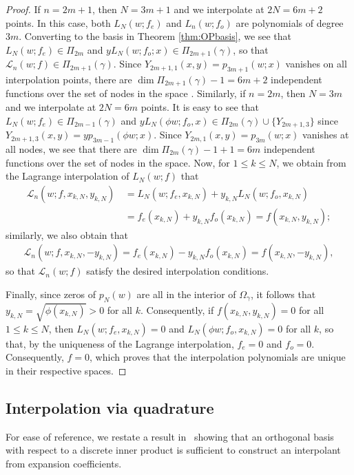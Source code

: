 \documentclass{amsart}
\theoremstyle{remark}
\def\g{{\gamma}}
\def\CL{{\mathcal L}}
\begin{document}
\begin{proof}
If $n = 2m+1$, then $N =3m+1$ and  we interpolate at $2N = 6m+2$ points. In this case, both 
$L_N(w;f_e)$ and $L_n(w;f_o)$ are polynomials of degree $3m$. Converting to the basis in 
Theorem \ref{thm:OPbasis}, we see that $L_N(w;f_e) \in \Pi_{2m}$ and $y L_N(w;f_o;x) \in \Pi_{2m+1}(\g)$,
so that $\CL_n(w;f) \in \Pi_{2m+1}(\g)$. Since $Y_{2m+1,1}(x,y) = p_{3m+1}(w;x)$ vanishes on all interpolation
points, there are $\dim \Pi_{2m+1}(\g) - 1 = 6m+2$ independent functions over the set of nodes in the space . 
Similarly, if $n=2m$, then $N = 3m$ and we interpolate at $2N = 6m$ points. It is easy to see that
$L_N(w;f_e) \in \Pi_{2m-1}(\g)$ and $y L_N(\phi w; f_o, x) \in \Pi_{2m}(\g) \cup \{Y_{2m+1,3}\}$ since
$Y_{2m+1,3}(x,y) = y p_{3m-1}(\phi w;x)$. Since $Y_{2m,1}(x,y) =p_{3m}(w;x)$ vanishes at all nodes, we
see that there are $\dim \Pi_{2m}(\g) - 1 + 1= 6m$ independent functions over the set of nodes in the space.  
Now, for $1\le k \le N$, we obtain from the Lagrange interpolation of $L_N(w; f)$ that 
\begin{align*}
 \CL_n(w; f, x_{k,N}, y_{k,N}) &\, =  L_N (w; f_e, x_{k,N}) + y_{k,N} L_{N} (w; f_o, x_{k,N}) \\
      & \, = f_e(x_{k,N}) + y_{k,N} f_o(x_{k,N}) = f(x_{k,N}, y_{k,N}); 
\end{align*}
similarly, we also obtain that 
\begin{align*}
 \CL_n(w; f, x_{k,N}, - y_{k,N}) = f_e(x_{k,N}) - y_{k,N} f_o(x_{k,N}) = f(x_{k,N}, - y_{k,N}), 
\end{align*}
so that $\CL_n(w;f)$ satisfy the desired interpolation conditions. 

Finally, since zeros of $p_N(w)$ are all in the interior of $\Omega_\g$, it follows that 
$y_{k,N} = \sqrt{\phi(x_{k,N})} > 0$ for all $k$. Consequently, if $f(x_{k,N}, y_{k,N}) =0$ for all $1 \le k \le N$, 
then $ L_N (w; f_e, x_{k,N}) =0$ and $ L_N (\phi w; f_o, x_{k,N}) =0$ for all $k$, so that, by the uniqueness
of the Lagrange interpolation, $f_e = 0$ and $f_o = 0$. Consequently, $f =0$, which proves that the interpolation
polynomials are unique in their respective spaces.  
\end{proof}

\subsection{Interpolation via quadrature}\label{sect:interpviaquad}

For ease of reference, we restate a result in~\cite{OX2} showing that an orthogonal basis with respect to a discrete inner product is sufficient to construct an interpolant from expansion coefficients. 
\end{document}
